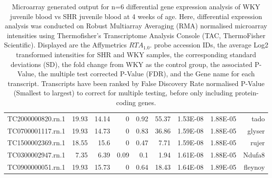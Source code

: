 \begin{sidewaystable}[]
\begin{tabular}{lrrrrrrrr}
TC2000000820.rn.1 & 19.93          & 14.14          & 0      & 0.92   & 55.37       & 1.53E-08 & 1.88E-05  & tado                          \\
TC0700001117.rn.1 & 19.93          & 14.73          & 0      & 0.83   & 36.86       & 1.59E-08 & 1.88E-05  & glyser                        \\
TC1500002369.rn.1 & 18.55          & 15.6           & 0      & 0.47   & 7.71        & 1.59E-08 & 1.88E-05  & rujer                         \\
TC0300002947.rn.1 & 7.35           & 6.39           & 0.09   & 0.1    & 1.94        & 1.61E-08 & 1.88E-05  & Ndufa8                        \\
TC0900000051.rn.1 & 19.93          & 15.73          & 0      & 0.64   & 18.43       & 1.64E-08 & 1.89E-05  & fleynoy                       

  
\end{tabular}
\caption[Microarray generated output for n=6 differential gene expression analysis of WKY juvenile blood vs SHR juvenile blood at 4 weeks of age. Cont.]{Microarray generated output for n=6 differential gene expression analysis of WKY juvenile blood vs SHR juvenile blood at 4 weeks of age. Here, differential expression analysis was conducted on Robust Multiarray Averaging (RMA) normalised microarray intensities using Thermofisher's Transcriptome Analysis Console (TAC, ThermoFisher Scientific). Displayed are the Affymetrics $RTA_1.0.$ probe accession IDs, the average Log2 transformed intensities for SHR and WKY samples, the corresponding standard deviations (SD), the fold change from WKY as the control group, the associated P-Value, the multiple test corrected P-Value (FDR), and the Gene name for each transcript. Transcripts have been ranked by False Discovery Rate normalised P-Value (Smallest to largest) to correct for multiple testing, before only including protein-coding genes.}
\label{fig:n6Microarray_cont}
\end{sidewaystable}


